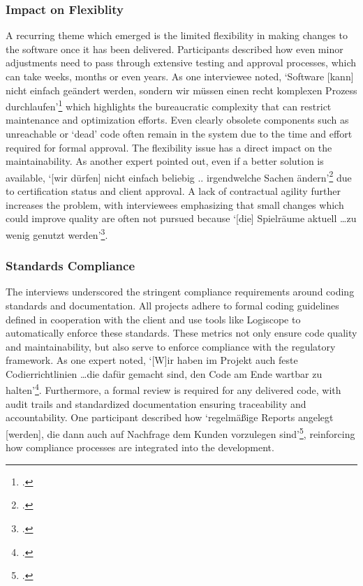 \subsubsection{Impact on Flexiblity}
A recurring theme which emerged is the limited flexibility in making changes to the software once it has been delivered. Participants described how even minor adjustments need to pass through extensive testing and approval processes, which can take weeks, months or even years.
As one interviewee noted, `Software [kann] nicht einfach geändert werden, sondern wir müssen einen recht komplexen Prozess durchlaufen'\footcite[69]{Interview22025} which highlights the bureaucratic complexity that can restrict maintenance and optimization efforts. Even clearly obsolete components such as unreachable or `dead' code
often remain in the system due to the time and effort required for formal approval.
The flexibility issue has a direct impact on the maintainability. As another expert pointed out, even if a better solution is available, `[wir dürfen] nicht einfach beliebig .. irgendwelche Sachen ändern'\footcite[84]{Interview32025} due to certification status and client approval. A lack of contractual agility further increases the problem,
with interviewees emphasizing that small changes which could improve quality are often not pursued because `[die] Spielräume aktuell \ldots zu wenig genutzt werden'\footcite[84]{Interview32025}.

\subsubsection{Standards Compliance}
The interviews underscored the stringent compliance requirements around coding standards and documentation. All projects adhere to formal coding guidelines defined in cooperation with the client and use tools like Logiscope to automatically enforce these standards.
These metrics not only ensure code quality and maintainability, but also serve to enforce compliance with the regulatory framework. As one expert noted, `[W]ir haben im Projekt auch feste Codierrichtlinien \ldots die dafür gemacht sind, den Code am Ende wartbar zu halten'\footcite[68]{Interview22025}.
Furthermore, a formal review is required for any delivered code, with audit trails and standardized documentation ensuring traceability and accountability. One participant described how `regelmäßige Reports angelegt [werden], die dann auch auf Nachfrage dem Kunden vorzulegen sind'\footcite[69]{Interview22025}, reinforcing how compliance processes are integrated into the development.

